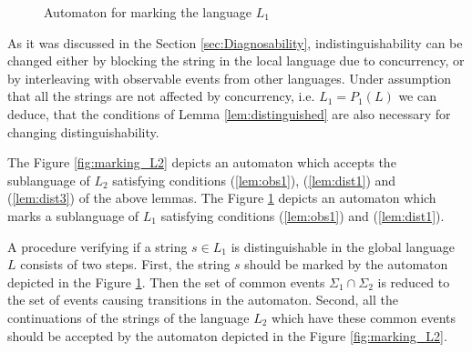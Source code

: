 \documentclass[letterpaper, 10pt, conference]{ieeeconf}
\begin{document}
\begin{figure}[t]
\centering
{}
\caption{Automaton for marking the language $L_1$}
\label{fig:marking_L1}
\end{figure}

As it was discussed in the Section \ref{sec:Diagnosability},
indistinguishability can be changed either by blocking the string in the local
language due to concurrency, or by interleaving with observable events from
other languages. Under assumption that all the strings are not affected by
concurrency, i.e. $L_1 = P_1(L)$ we can deduce, that the conditions of Lemma
\ref{lem:distinguished} are also necessary for changing distinguishability. 

The Figure \ref{fig:marking_L2} depicts an automaton which
accepts the sublanguage of $L_2$ satisfying conditions (\ref{lem:obs1}),
(\ref{lem:dist1}) and (\ref{lem:dist3}) of the above lemmas.
The Figure \ref{fig:marking_L1} depicts an automaton which
marks a sublanguage of $L_1$ satisfying conditions (\ref{lem:obs1}) and
(\ref{lem:dist1}). 

A procedure verifying if a string $s \in L_1$ is distinguishable in the global
language $L$ consists of two steps. First, the string $s$ should be marked by
the automaton depicted in the Figure \ref{fig:marking_L1}. Then the set of
common events $\Sigma_1 \cap \Sigma_2$ is reduced to the set of events causing
transitions in the automaton. Second, all the continuations of the strings of
the language $L_2$ which have these common events should be accepted by the
automaton depicted in the Figure
\ref{fig:marking_L2}.
\end{document}
